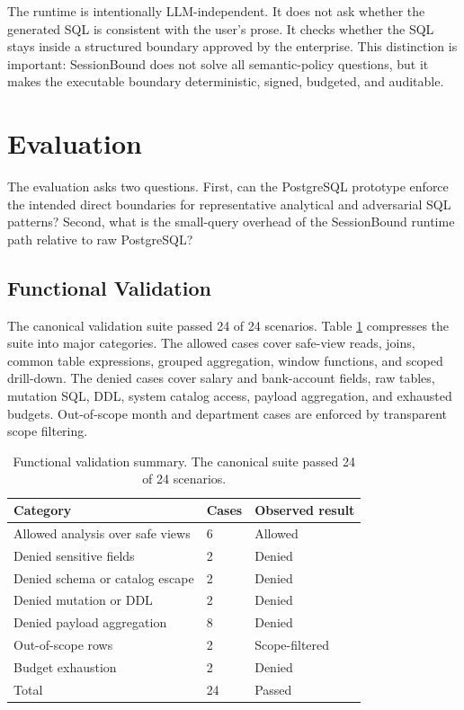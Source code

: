 \documentclass[10pt,twocolumn]{article}
\begin{document}
The runtime is intentionally LLM-independent. It does not ask whether
the generated SQL is consistent with the user's prose. It checks whether
the SQL stays inside a structured boundary approved by the enterprise.
This distinction is important: SessionBound does not solve all
semantic-policy questions, but it makes the executable boundary
deterministic, signed, budgeted, and auditable.

\section{Evaluation}

The evaluation asks two questions. First, can the PostgreSQL prototype
enforce the intended direct boundaries for representative analytical and
adversarial SQL patterns? Second, what is the small-query overhead of
the SessionBound runtime path relative to raw PostgreSQL?

\subsection{Functional Validation}

The canonical validation suite passed 24 of 24 scenarios. Table
\ref{tab:validation} compresses the suite into major categories. The
allowed cases cover safe-view reads, joins, common table expressions,
grouped aggregation, window functions, and scoped drill-down. The denied
cases cover salary and bank-account fields, raw tables, mutation SQL,
DDL, system catalog access, payload aggregation, and exhausted budgets.
Out-of-scope month and department cases are enforced by transparent
scope filtering.

\begin{table}[t]
\centering
\small
\caption{Functional validation summary. The canonical suite passed 24 of 24 scenarios.}
\label{tab:validation}
\begin{tabular}{@{}p{}p{}p{}@{}}
\toprule
Category & Cases & Observed result \\
\midrule
Allowed analysis over safe views & 6 & Allowed \\
Denied sensitive fields & 2 & Denied \\
Denied schema or catalog escape & 2 & Denied \\
Denied mutation or DDL & 2 & Denied \\
Denied payload aggregation & 8 & Denied \\
Out-of-scope rows & 2 & Scope-filtered \\
Budget exhaustion & 2 & Denied \\
\midrule
Total & 24 & Passed \\
\bottomrule
\end{tabular}
\end{table}
\end{document}
